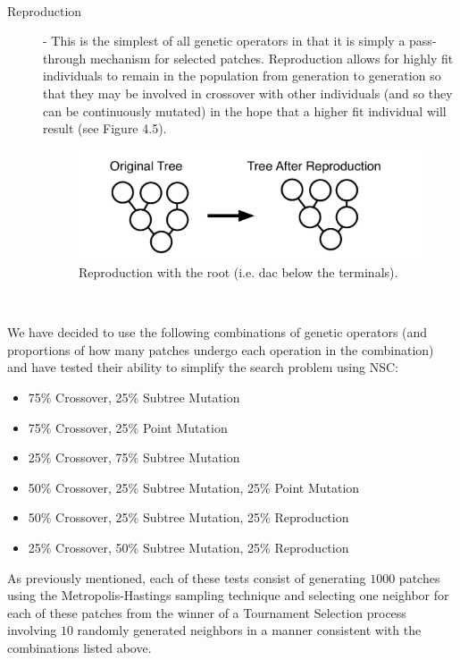 \documentclass[12pt]{report} 	%
\numberwithin{figure}{chapter}
\numberwithin{table}{chapter}
\numberwithin{equation}{chapter}
\begin{document}
\begin{flushleft}
\begin{description}
\begin{figure}[h!]
\begin{center}
\end{center}
\end{figure}
\\
\item[Reproduction] - This is the simplest of all genetic operators in that it is simply a pass-through mechanism for selected patches. Reproduction allows for highly fit individuals to remain in the population from generation to generation so that they may be involved in crossover with other individuals (and so they can be continuously mutated) in the hope that a higher fit individual will result (see Figure 4.5).
\begin{figure}[h!]
\begin{center}
\includegraphics[scale=0.5]{Reproduction}
\caption[Reproduction]{Reproduction with the root (i.e. dac\texttildelow{} below the terminals).}
\end{center}
\end{figure}
\\
\end{description}

We have decided to use the following combinations of genetic operators (and proportions of how many patches undergo each operation in the combination) and have tested their ability to simplify the search problem using NSC:

\begin{itemize}
\item 75\% Crossover, 25\% Subtree Mutation
\item 75\% Crossover, 25\% Point Mutation
\item 25\% Crossover, 75\% Subtree Mutation
\item 50\% Crossover, 25\% Subtree Mutation, 25\% Point Mutation
\item 50\% Crossover, 25\% Subtree Mutation, 25\% Reproduction
\item 25\% Crossover, 50\% Subtree Mutation, 25\% Reproduction
\end{itemize}
As previously mentioned, each of these tests consist of generating $1000$ patches using the Metropolis-Hastings sampling technique and selecting one neighbor for each of these patches from the winner of a Tournament Selection process involving $10$ randomly generated neighbors in a manner consistent with the combinations listed above.


\end{flushleft}
\end{document}
